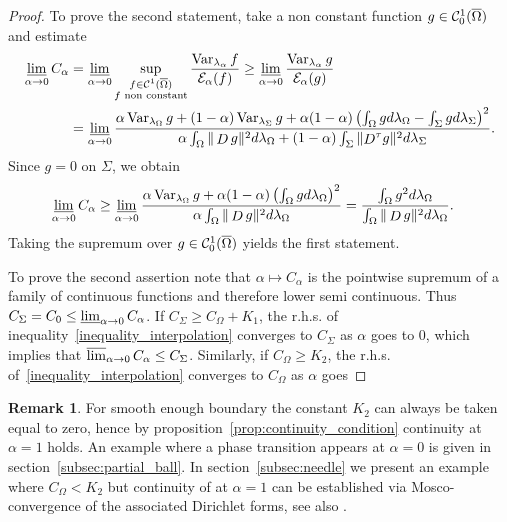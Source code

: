\documentclass[a4paper]{article}
\theoremstyle{definition}
\newtheorem{remark}[theorem]{Remark}
\DeclareMathOperator{\Var}{Var}
\numberwithin{equation}{section}
\begin{document}
\begin{proof} 
To prove the second statement, take a non constant function $g \in \mathcal{C}^1_{0}(\overline\Omega)$ and estimate 
  \begin{align*}
    \varliminf_{ \alpha \to 0 }C_{\alpha}&= \varliminf_{ \alpha \to 0 }\sup_{\substack {f \in \mC^1(\overline \Omega) \\ f \text{ non constant}}}  \frac{\Var_{\lambda_\alpha} f}{\e_\alpha (f)}\geq \varliminf_{ \alpha \to 0 }\frac{\Var_{\lambda_\alpha} g}{\e_\alpha (g)}\\
    &= \varliminf_{ \alpha \to 0 } \frac{ \alpha\Var_{\lambda_{\Omega}}g+(1-\alpha)\Var_{\lambda_{\Sigma}}g+\alpha(1-\alpha)\left( \int_{ \Omega }   gd \lambda_{\Omega}-\int_{ \Sigma }   gd \lambda_{\Sigma}   \right)^2 }{ \alpha \int_{ \Omega }   \|\Deriv g\|^2 d\lambda_{\Omega}+(1-\alpha)\int_{ \Sigma}   \|\bDeriv g\|^2 d \lambda_{\Sigma }   }.
  \end{align*}
 Since $g=0$ on $\Sigma$, we obtain
  \begin{align*}
    \varliminf_{ \alpha \to 0 }C_{\alpha}&\geq \varliminf_{ \alpha \to 0 } \frac{ \alpha\Var_{\lambda_{\Omega}}g+\alpha(1-\alpha)\left( \int_{ \Omega }   gd \lambda_{\Omega}  \right)^2 }{ \alpha \int_{ \Omega }   \|\Deriv g\|^2 d \lambda_{\Omega}  } = \frac{ \int_\Omega g^2 d\lambda_\Omega }{ \int_{ \Omega }   \|\Deriv g\|^2 d \lambda_{\Omega}  } .
  \end{align*}
Taking the supremum over $g \in \mathcal{C}^1_0(\overline\Omega)$  yields the first statement. 
  
To prove the second assertion  note that $ \alpha \mapsto C_\alpha$ is the pointwise supremum of a family of continuous functions and therefore lower semi continuous. 
Thus $C_\Sigma=C_0 \leq \varliminf_{\alpha \to 0} C_\alpha$. 
If $C_\Sigma \geq C_\Omega+K_1$, the r.h.s. of inequality~\eqref{inequality_interpolation} converges to $C_\Sigma$ as $\alpha$ goes to 0, which implies that  $ \varlimsup_{\alpha \to 0} C_\alpha  \leq C_\Sigma$. Similarly, if $C_{\Omega} \geq K_2$, the r.h.s. of~\eqref{inequality_interpolation} converges to $C_\Omega$ as $\alpha$ goes \end{proof}



\begin{remark}  For smooth enough boundary 
the constant $K_2$ can always be taken equal to zero, hence by proposition~\ref{prop:continuity_condition} continuity at $\alpha=1$ holds. An example where a phase transition appears at $\alpha=0$ is given in section~\ref{subsec:partial_ball}.  In section~\ref{subsec:needle} we present an example where  $C_\Omega<K_2$ but continuity of at $\alpha =1$ can  be established via Mosco-convergence \cite{MR1283033} of the associated Dirichlet forms, see also \cite{MR3154581}.
\end{remark}
\end{document}
